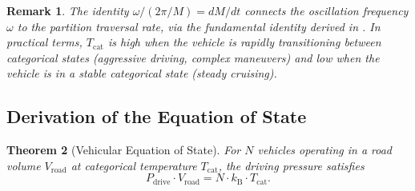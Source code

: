 \documentclass[twocolumn,10pt]{article}
\newtheorem{theorem}{Theorem}[section]
\newtheorem{remark}[theorem]{Remark}
\newcommand{\kB}{k_{\mathrm{B}}}
\newcommand{\Tcat}{T_{\mathrm{cat}}}
\newcommand{\Pdrive}{P_{\mathrm{drive}}}
\newcommand{\Vroad}{V_{\mathrm{road}}}
\begin{document}
\begin{remark}
The identity $\omega / (2\pi / M) = dM/dt$ connects the oscillation frequency $\omega$ to the partition traversal rate, via the fundamental identity derived in \cite{sachikonye2026trajectory}. In practical terms, $\Tcat$ is high when the vehicle is rapidly transitioning between categorical states (aggressive driving, complex maneuvers) and low when the vehicle is in a stable categorical state (steady cruising).
\end{remark}

\subsection{Derivation of the Equation of State}

\begin{theorem}[Vehicular Equation of State]\label{thm:eos}
For $N$ vehicles operating in a road volume $\Vroad$ at categorical temperature $\Tcat$, the driving pressure satisfies
\begin{equation}\label{eq:eos}
\Pdrive \cdot \Vroad = N \cdot \kB \cdot \Tcat.
\end{equation}
\end{theorem}
\end{document}
